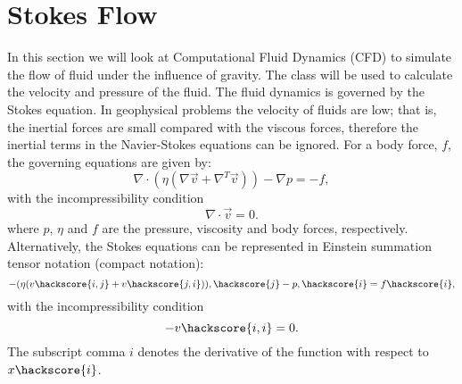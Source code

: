 
\section{Stokes Flow}
\label{STOKES FLOW CHAP}

In this section we will look at Computational Fluid Dynamics (CFD) to simulate the flow of fluid under the influence of gravity. The  class will be used to calculate the velocity and pressure of the fluid.
The fluid dynamics is governed by the Stokes equation. In geophysical problems the velocity of fluids are low; that is, the inertial forces are small compared with the viscous forces, therefore the inertial terms in the Navier-Stokes equations can be ignored. For a body force, $f$, the governing equations are given by:
%
\begin{equation}
\nabla \cdot (\eta(\nabla \vec{v} + \nabla^{T} \vec{v})) - \nabla p = -f,
\label{GENERAL NAVIER STOKES}
\end{equation}
%
with the incompressibility condition
%
\begin{equation}
\nabla \cdot \vec{v} = 0.
\label{INCOMPRESSIBILITY}
\end{equation}
%
where $p$, $\eta$ and $f$ are the pressure, viscosity and body forces, respectively. 
Alternatively, the Stokes equations can be represented in Einstein summation tensor notation (compact notation):
%
\begin{equation}
-(\eta(v\hackscore{i,j} + v\hackscore{j,i})),\hackscore{j} - p,\hackscore{i} = f\hackscore{i},
\label{GENERAL NAVIER STOKES COM}
\end{equation}
%
with the incompressibility condition
%
\begin{equation}
-v\hackscore{i,i} = 0.
\label{INCOMPRESSIBILITY COM}
\end{equation}
%
The subscript comma $i$ denotes the derivative of the function with respect to $x\hackscore{i}$.
%
%
%
